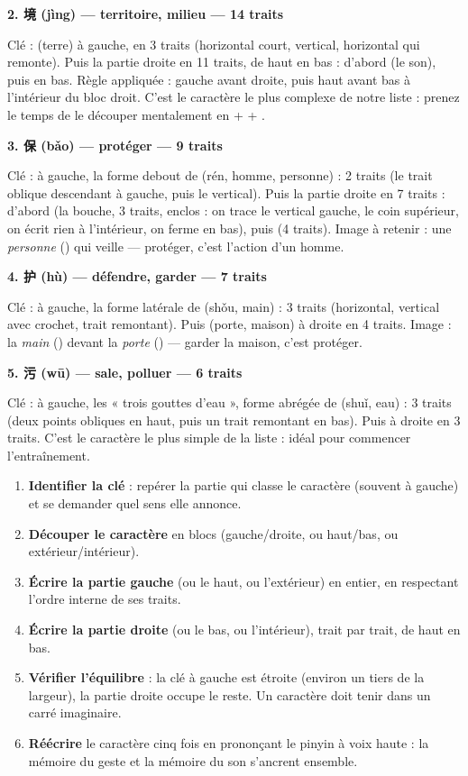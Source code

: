 \documentclass[11pt]{article}
\newcommand{\zh}[1]{\ifmmode\text{#1}\else{#1}\fi}
\begin{document}
\textbf{2. 境 (jìng) — territoire, milieu — 14 traits}\par
Clé : \zh{土} (terre) à gauche, en 3 traits (horizontal court, vertical, horizontal qui remonte). Puis la partie droite \zh{竟} en 11 traits, de haut en bas : d'abord \zh{音} (le son), puis \zh{儿} en bas. Règle appliquée : gauche avant droite, puis haut avant bas à l'intérieur du bloc droit. C'est le caractère le plus complexe de notre liste : prenez le temps de le découper mentalement en \zh{土} + \zh{音} + \zh{儿}.

\textbf{3. 保 (bǎo) — protéger — 9 traits}\par
Clé : \zh{亻} à gauche, la forme debout de \zh{人} (rén, homme, personne) : 2 traits (le trait oblique descendant à gauche, puis le vertical). Puis la partie droite \zh{呆} en 7 traits : d'abord \zh{口} (la bouche, 3 traits, enclos : on trace le vertical gauche, le coin supérieur, on écrit rien à l'intérieur, on ferme en bas), puis \zh{木} (4 traits). Image à retenir : une \emph{personne} (\zh{亻}) qui veille — protéger, c'est l'action d'un homme.

\textbf{4. 护 (hù) — défendre, garder — 7 traits}\par
Clé : \zh{扌} à gauche, la forme latérale de \zh{手} (shǒu, main) : 3 traits (horizontal, vertical avec crochet, trait remontant). Puis \zh{户} (porte, maison) à droite en 4 traits. Image : la \emph{main} (\zh{扌}) devant la \emph{porte} (\zh{户}) — garder la maison, c'est protéger.

\textbf{5. 污 (wū) — sale, polluer — 6 traits}\par
Clé : \zh{氵} à gauche, les « trois gouttes d'eau », forme abrégée de \zh{水} (shuǐ, eau) : 3 traits (deux points obliques en haut, puis un trait remontant en bas). Puis \zh{亏} à droite en 3 traits. C'est le caractère le plus simple de la liste : idéal pour commencer l'entraînement.

\begin{methode}
\begin{enumerate}
\item \textbf{Identifier la clé} : repérer la partie qui classe le caractère (souvent à gauche) et se demander quel sens elle annonce.
\item \textbf{Découper le caractère} en blocs (gauche/droite, ou haut/bas, ou extérieur/intérieur).
\item \textbf{Écrire la partie gauche} (ou le haut, ou l'extérieur) en entier, en respectant l'ordre interne de ses traits.
\item \textbf{Écrire la partie droite} (ou le bas, ou l'intérieur), trait par trait, de haut en bas.
\item \textbf{Vérifier l'équilibre} : la clé à gauche est étroite (environ un tiers de la largeur), la partie droite occupe le reste. Un caractère doit tenir dans un carré imaginaire.
\item \textbf{Réécrire} le caractère cinq fois en prononçant le pinyin à voix haute : la mémoire du geste et la mémoire du son s'ancrent ensemble.
\end{enumerate}
\end{methode}
\end{document}
